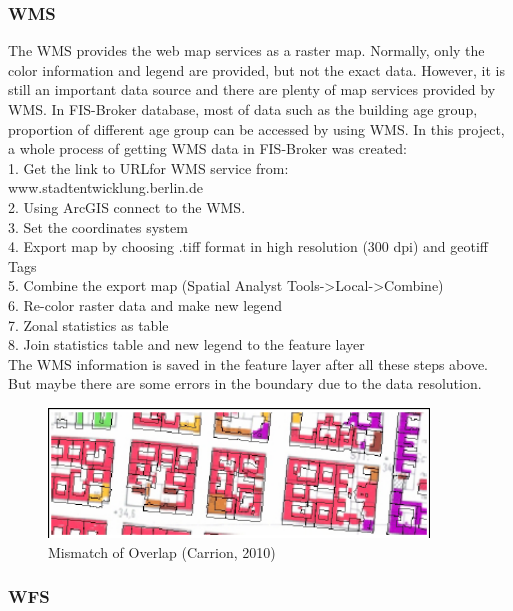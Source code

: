 \documentclass[11pt]{article}
\begin{document}
\subsubsection{WMS}

The WMS provides the web map services as a raster map. Normally, only the color information and legend are provided, but not the exact data. However, it is still an important data source and there are plenty of map services provided by WMS. In FIS-Broker database, most of data such as the building age group, proportion of different age group can be accessed by using WMS. 
In this project, a whole process of getting WMS data in FIS-Broker was created: \\
1. Get the link to URLfor WMS service from:\\
www.stadtentwicklung.berlin.de\\
2. Using ArcGIS connect to the WMS.\\
3. Set the coordinates system\\
4. Export map by choosing .tiff format in high resolution (300 dpi) and geotiff Tags\\
5. Combine the export map (Spatial Analyst Tools->Local->Combine)\\
6. Re-color raster data and make new legend\\
7. Zonal statistics as table\\
8. Join statistics table and new legend to the feature layer\\

The WMS information is saved in the feature layer after all these steps above. But maybe there are some errors in the boundary due to the data resolution. \\
\begin{figure}[ht]
	\centering
	\includegraphics[width=0.9\textwidth]{fig2.png}
	\caption{Mismatch of Overlap (Carrion, 2010)}
	\label{fig:figure2}
\end{figure}
\subsubsection{WFS}
\end{document}
